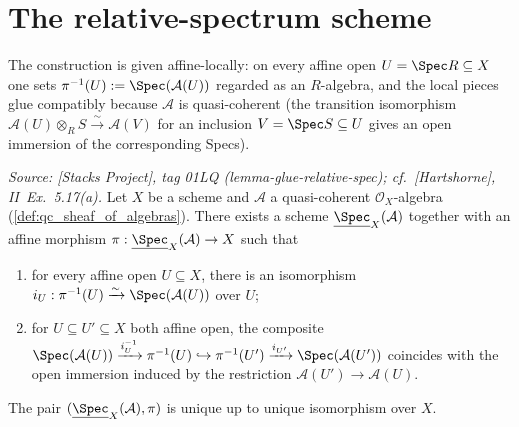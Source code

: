 \section{The relative-spectrum scheme}
\label{sec:relspec_scheme}

The construction is given affine-locally: on every affine open \(U = \Spec R \subseteq X\) one
sets \(\pi^{-1}(U) := \Spec(\mathcal{A}(U))\) regarded as an \(R\)-algebra, and the local pieces
glue compatibly because \(\mathcal{A}\) is quasi-coherent (the transition isomorphism
\(\mathcal{A}(U) \otimes_R S \xrightarrow{\sim} \mathcal{A}(V)\) for an inclusion
\(V = \Spec S \subseteq U\) gives an open immersion of the corresponding Specs).

\begin{theorem}
  \label{thm:relative_spec_exists}

  \textit{Source: [Stacks Project], tag 01LQ (lemma-glue-relative-spec);
  cf.\ [Hartshorne], II~Ex.~5.17(a).}
  Let \(X\) be a scheme and \(\mathcal{A}\) a quasi-coherent \(\mathcal{O}_X\)-algebra
  (\cref{def:qc_sheaf_of_algebras}). There exists a scheme
  \(\underline{\Spec}_X(\mathcal{A})\) together with an affine morphism
  \(\pi : \underline{\Spec}_X(\mathcal{A}) \to X\) such that
  \begin{enumerate}
    \item for every affine open \(U \subseteq X\), there is an isomorphism
      \(i_U : \pi^{-1}(U) \xrightarrow{\sim} \Spec(\mathcal{A}(U))\) over \(U\);
    \item for \(U \subseteq U' \subseteq X\) both affine open, the composite
      $\Spec(\mathcal{A}(U)) \xrightarrow{i_U^{-1}} \pi^{-1}(U) \hookrightarrow
      \pi^{-1}(U') \xrightarrow{i_{U'}} \Spec(\mathcal{A}(U'))$
      coincides with the open immersion induced by the restriction
      \(\mathcal{A}(U') \to \mathcal{A}(U)\).
  \end{enumerate}
  The pair \((\underline{\Spec}_X(\mathcal{A}), \pi)\) is unique up to unique isomorphism
  over \(X\).
\end{theorem}

